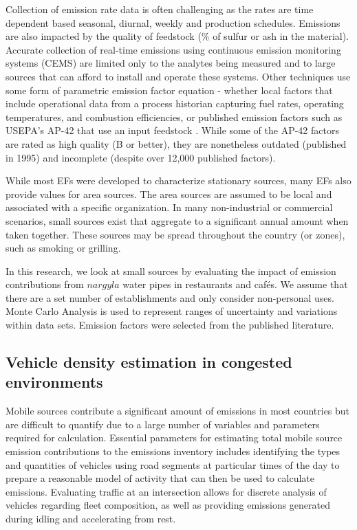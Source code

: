 Collection of emission rate data is often challenging as the rates are time dependent based seasonal, diurnal, weekly and production schedules. Emissions are also impacted by the quality of feedstock (\% of sulfur or ash in the material). Accurate collection of real-time emissions using continuous emission monitoring systems (CEMS) are limited only to the analytes being measured and to large sources that can afford to install and operate these systems. Other techniques use some form of parametric emission factor equation - whether local factors that include operational data from a process historian capturing fuel rates, operating temperatures, and combustion efficiencies, or published emission factors such as USEPA's AP-42 that use an input feedstock \citep{USEPA1995}. While some of the AP-42 factors are rated as high quality (B or better), they are nonetheless outdated (published in 1995) and incomplete (despite over 12,000 published factors).

While most EFs were developed to characterize stationary sources, many EFs also provide values for area sources. The area sources are assumed to be local and associated with a specific organization. In many non-industrial or commercial scenarios, small sources exist that aggregate to a significant annual amount when taken together.  These sources may be spread throughout the country (or zones), such as smoking or grilling.

In this research, we look at small sources by evaluating the impact of emission contributions from $nargyla$ water pipes in restaurants and caf\'es. We assume that there are a set number of establishments and only consider non-personal uses.  Monte Carlo Analysis is used to represent ranges of uncertainty and variations within data sets. Emission factors were selected from the published literature.

\subsection{Vehicle density estimation in congested environments}

Mobile sources contribute a significant amount of emissions in most countries but are difficult to quantify due to a large number of variables and parameters required for calculation. Essential parameters for estimating total mobile source emission contributions to the emissions inventory includes identifying the types and quantities of vehicles using road segments at particular times of the day to prepare a reasonable model of activity that can then be used to calculate emissions. Evaluating traffic at an intersection allows for discrete analysis of vehicles regarding fleet composition, as well as providing emissions generated during idling and accelerating from rest.

